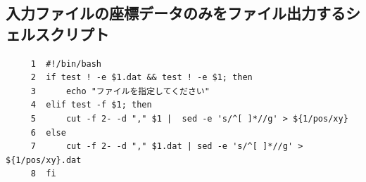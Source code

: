\documentclass{jsarticle}
\begin{document}
\subsection{入力ファイルの座標データのみをファイル出力するシェルスクリプト}
\scriptsize
\begin{verbatim}
     1	#!/bin/bash
     2	if test ! -e $1.dat && test ! -e $1; then
     3	    echo "ファイルを指定してください"
     4	elif test -f $1; then
     5	    cut -f 2- -d "," $1 |  sed -e 's/^[ ]*//g' > ${1/pos/xy}
     6	else
     7	    cut -f 2- -d "," $1.dat | sed -e 's/^[ ]*//g' > ${1/pos/xy}.dat
     8	fi
\end{verbatim}
\normalsize



% 
% 
% 
\end{document}
